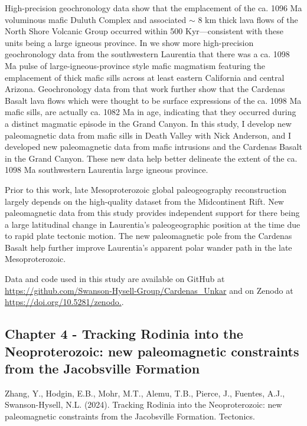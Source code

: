 \documentclass{ucbthesis}
\begin{document}
\begin{frontmatter}
High-precision geochronology data show that the emplacement of the ca. 1096 Ma voluminous mafic Duluth Complex and associated $\sim$ 8 km thick lava flows of the North Shore Volcanic Group occurred within 500 Kyr---consistent with these units being a large igneous province. In \cite{Mohr2024a} we show more high-precision geochronology data from the southwestern Laurentia that there was a ca. 1098 Ma pulse of large-igneous-province style mafic magmatism featuring the emplacement of thick mafic sills across at least eastern California and central Arizona. Geochronology data from that work further show that the Cardenas Basalt lava flows which were thought to be surface expressions of the ca. 1098 Ma mafic sills, are actually ca. 1082 Ma in age, indicating that they occurred during a distinct magmatic episode in the Grand Canyon. In this study, I develop new paleomagnetic data from mafic sills in Death Valley with Nick Anderson, and I developed new paleomagnetic data from mafic intrusions and the Cardenas Basalt in the Grand Canyon. These new data help better delineate the extent of the ca. 1098 Ma southwestern Laurentia large igneous province.

Prior to this work, late Mesoproterozoic global paleogeography reconstruction largely depends on the high-quality dataset from the Midcontinent Rift. New paleomagnetic data from this study provides independent support for there being a large latitudinal change in Laurentia's paleogeographic position at the time due to rapid plate tectonic motion. The new paleomagnetic pole from the Cardenas Basalt help further improve Laurentia's apparent polar wander path in the late Mesoproterozoic.

Data and code used in this study are available on GitHub at \url{https://github.com/Swanson-Hysell-Group/Cardenas_Unkar} and on Zenodo at \url{https://doi.org/10.5281/zenodo.}.

\clearpage 

\subsection{Chapter 4 - Tracking Rodinia into the Neoproterozoic: new paleomagnetic constraints from the Jacobsville Formation}

Zhang, Y., Hodgin, E.B., Mohr, M.T., Alemu, T.B., Pierce, J., Fuentes, A.J., Swanson-Hysell, N.L. (2024). Tracking Rodinia into the Neoproterozoic: new paleomagnetic constraints from the Jacobsville Formation. Tectonics. 
\\


\end{frontmatter}
\end{document}
